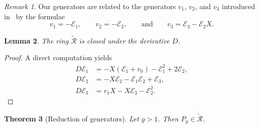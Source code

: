 \documentclass[10pt]{amsart}
\newtheorem{thm}{Theorem}[section]
\newtheorem{lem}[thm]{Lemma}
\theoremstyle{definition}
\theoremstyle{remark}
\newtheorem{rmk}[thm]{Remark}
\theoremstyle{plain}
\theoremstyle{definition}
\theoremstyle{remark}
\newcommand{\msc}[1]{\mathscr{#1}}
\newcommand{\1}{\mathbf{1}}
\newcommand{\2}{\mathbf{2}}
\newcommand{\3}{\mathbf{3}}
\numberwithin{equation}{section}
\begin{document}
\begin{rmk}
    Our generators are related to the generators $v_1$, $v_2$, and $v_3$ introduced in~\cite{yy04} by the formulae
    \[ v_1 = -\msc{E}_1, \qquad v_2 = -\msc{E}_2, \qquad \text{and} \qquad v_3 = \msc{E}_3 - \msc{E}_2 X. \]
\end{rmk}

\begin{lem}
    The ring $\tilde{\msc{R}}$ is closed under the derivative $D$.
\end{lem}

\begin{proof}
    A direct computation yields
    \begin{align*}
        D \msc{E}_1 &= -X(\msc{E}_1 + r_0) - \msc{E}_1^2 + 2 \msc{E}_2, \\
        D \msc{E}_2 &= -X \msc{E}_2 - \msc{E}_1 \msc{E}_2 + \msc{E}_3, \\
        D \msc{E}_3 &= r_1 X - X \msc{E}_3 - \msc{E}_2^2.
    \end{align*}
\end{proof}

\begin{thm}[Reduction of generators]\label{thm:reduction}
    Let $g > 1$. Then $P_g \in \tilde{\msc{R}}$.
\end{thm}
\end{document}
